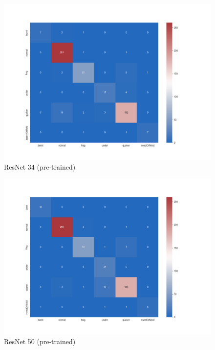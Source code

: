 \begin{figure}
    \centering
    \includegraphics[width=\textwidth]{figures/confusionMatrices/resnet_34_whitebg_94_acc_8_batch}
    \caption{ResNet 34 (pre-trained)}
    \label{fig:resnet34}
\end{figure}

\begin{figure}
    \centering
    \includegraphics[width=\textwidth]{figures/confusionMatrices/resnet_50_95_acc}
    \caption{ResNet 50 (pre-trained)}
    \label{fig:resnet50}
\end{figure}

